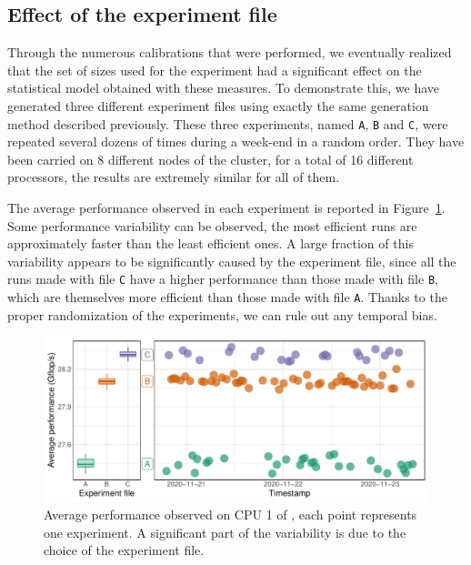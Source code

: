         \subsection{Effect of the experiment file}%
        \label{sub:effect_experiment_file}

            Through the numerous \dgemm calibrations that were performed, we eventually realized that the set of sizes
            used for the experiment had a significant effect on the statistical model obtained with these measures. To
            demonstrate this, we have generated three different experiment files using exactly the same generation
            method described previously. These three experiments, named \texttt{A}, \texttt{B} and \texttt{C}, were
            repeated several dozens of times during a week-end in a random order. They have been carried on 8 different
            nodes of the \dahu cluster, for a total of 16 different processors, the results are extremely similar for all
            of them.

            The average \dgemm performance observed in each experiment is reported in
            Figure~\ref{fig:randomizing_sizes:expfile:average_perf}. Some performance variability can be observed, the
            most efficient runs are approximately  faster than the least efficient ones. A large
            fraction of this variability appears to be significantly caused by the experiment file, since all the runs
            made with file \texttt{C} have a higher performance than those made with file \texttt{B}, which are
            themselves more efficient than those made with file \texttt{A}. Thanks to the proper randomization of the
            experiments, we can rule out any temporal bias.

            \begin{figure}[htpb]
                \centering
                \includegraphics[width=\linewidth]{img/experiment/randomizing_sizes/expfile/average_performance.pdf}
                \caption{Average performance observed on CPU 1 of \dahu[5], each point represents one experiment. A
                significant part of the variability is due to the choice of the experiment file.}%
                \label{fig:randomizing_sizes:expfile:average_perf}
            \end{figure}

